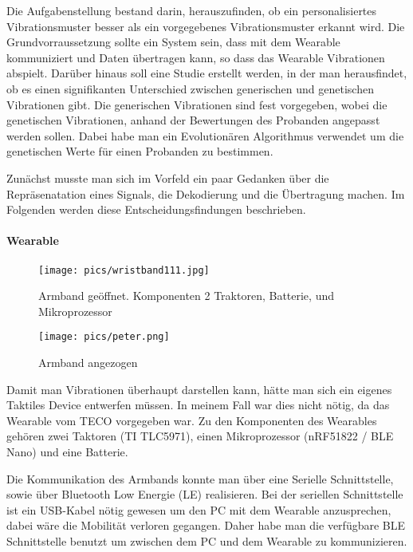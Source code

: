 
Die Aufgabenstellung bestand darin, herauszufinden, ob ein personalisiertes Vibrationsmuster besser als ein vorgegebenes Vibrationsmuster erkannt wird.
Die Grundvorraussetzung sollte ein System sein, dass mit dem Wearable kommuniziert und Daten {\"u}bertragen kann, so dass das Wearable Vibrationen abspielt. 
Dar{\"u}ber hinaus soll eine Studie erstellt werden, in der man herausfindet, ob es einen signifikanten Unterschied zwischen generischen und genetischen Vibrationen gibt. 
Die generischen Vibrationen sind fest vorgegeben, wobei die genetischen Vibrationen, anhand der Bewertungen des Probanden angepasst werden sollen. 
Dabei habe man ein Evolution{\"a}ren Algorithmus verwendet um die genetischen Werte f{\"u}r einen Probanden zu bestimmen. 

Zunächst musste man sich im Vorfeld ein paar Gedanken {\"u}ber die Repr{\"a}senatation eines Signals, die Dekodierung und die {\"U}bertragung machen.
Im Folgenden werden diese Entscheidungsfindungen beschrieben.

\paragraph{Wearable}

\begin{figure}
	\centering
    \texttt{[image: pics/wristband111.jpg]}
    \caption{Armband ge{\"o}ffnet. Komponenten 2 Traktoren, Batterie, und Mikroprozessor}
    \label{fig:wristband1}
\end{figure}

\begin{figure}
	\centering
    \texttt{[image: pics/peter.png]}
    \caption{Armband angezogen}
    \label{fig:wristband2}
\end{figure}

Damit man Vibrationen {\"u}berhaupt darstellen kann, h{\"a}tte man sich ein eigenes Taktiles Device entwerfen m{\"u}ssen. In meinem Fall war dies nicht n{\"o}tig, da das Wearable vom TECO vorgegeben war. Zu den Komponenten des Wearables gehören zwei Taktoren (TI TLC5971), einen Mikroprozessor (nRF51822 / BLE Nano) und eine Batterie.

Die Kommunikation des Armbands konnte man {\"u}ber eine Serielle Schnittstelle, sowie {\"u}ber Bluetooth Low Energie (LE) realisieren.
Bei der seriellen Schnittstelle ist ein USB-Kabel n{\"o}tig gewesen um den PC mit dem Wearable anzusprechen, dabei w{\"a}re die Mobilit{\"a}t verloren gegangen. Daher habe man die verf{\"u}gbare BLE Schnittstelle benutzt um zwischen dem PC und dem Wearable zu kommunizieren. 

